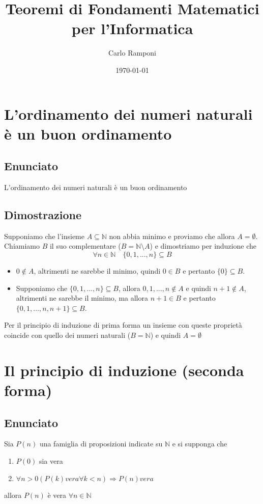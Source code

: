 \documentclass[a4paper,12pt]{article}
\begin{document}
\title{Teoremi di Fondamenti Matematici per l'Informatica}
\author{Carlo Ramponi}
\date{\today}
\maketitle

\newpage
\section{L'ordinamento dei numeri naturali è un buon ordinamento} 
\subsection*{Enunciato}
L'ordinamento dei numeri naturali è un buon ordinamento
\subsection*{Dimostrazione}
Supponiamo che l'insieme $ A \subseteq \mathbb{N} $ non abbia minimo e proviamo che allora $ A = \emptyset $. Chiamiamo $ B $ il suo complementare ($ B = \mathbb{N} \setminus A $) e dimostriamo per induzione che \[ \forall n \in \mathbb{N} \quad \{0, 1, ..., n\} \subseteq B \]
\begin{itemize}
	\item $ 0 \notin A  $, altrimenti ne sarebbe il minimo, quindi $ 0 \in B $ e pertanto $ \{0\} \subseteq B $.
	\item Supponiamo che $\{0, 1, ..., n\} \subseteq B$, allora $0, 1, ..., n \notin A$ e quindi $n+1 \notin A$, altrimenti ne sarebbe il minimo, ma allora $n+1 \in B$ e pertanto $\{0, 1, ..., n, n+1\} \subseteq B$.\\
\end{itemize}
Per il principio di induzione di prima forma un insieme con queste proprietà coincide con quello dei numeri naturali ($B = \mathbb{N}$) e quindi $A = \emptyset$

\clearpage
\section{Il principio di induzione (seconda forma)}
\subsection*{Enunciato}
Sia $P(n)$ una famiglia di proposizioni indicate su $\mathbb{N}$ e si supponga che
\begin{enumerate}
	\item $P(0)$ sia vera
	\item $\forall n > 0 (P(k) vera \forall k < n) \Rightarrow P(n) vera$
\end{enumerate}
allora $P(n)$ è vera $\forall n \in \mathbb{N}$
\end{document}
